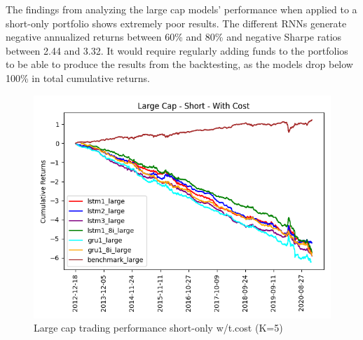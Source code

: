 \indent\newline
\begin{table}[ht]
\centering
{}
\caption{Large cap trading performance short-only w/t.cost (K=5)}
\end{table}
\indent\newline
The findings from analyzing the large cap models' performance when applied to a short-only portfolio shows extremely poor results. The different RNNs generate negative annualized returns between 60\% and 80\% and negative Sharpe ratios between 2.44 and 3.32. It would require regularly adding funds to the portfolios to be able to produce the results from the backtesting, as the models drop below 100\% in total cumulative returns.  
\indent\newline 
\begin{figure}[H]
\centering
\includegraphics [scale=0.60,angle=360]{figures/cumulative_large_cap_return_with_cost_s.png}
\caption{Large cap trading performance short-only w/t.cost (K=5)}
\label{fig:shortlargec}
\end{figure} 
